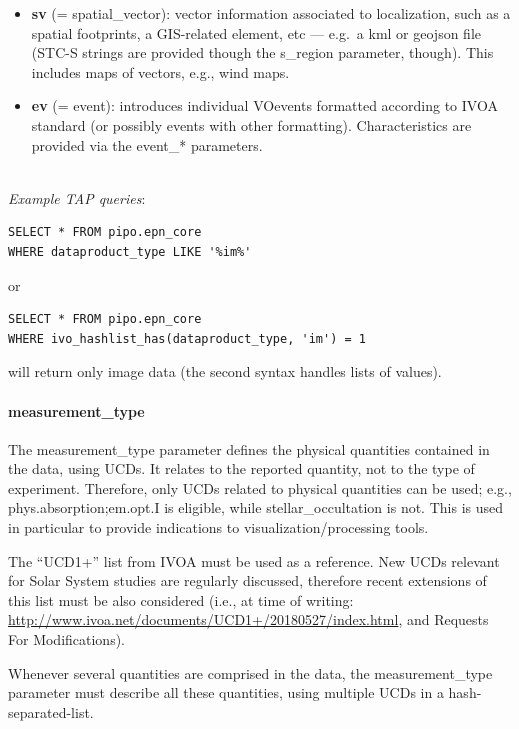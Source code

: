 \documentclass[11pt,a4paper]{ivoa}
\begin{document}
\begin{itemize}
\item \textbf{sv} (= spatial\_vector): vector information associated
to localization, such as a spatial footprints, a GIS-related element,
etc —  e.g.\ a kml or geojson file (STC-S strings are provided though
the s\_region parameter, though). This includes maps of vectors, e.g.,
wind maps.

\item \textbf{ev} (= event): introduces individual VOevents
formatted according to IVOA standard (or possibly events with other
formatting). Characteristics are provided via the event\_* parameters.

\end{itemize}

\textbf{\\}
\emph{Example TAP queries}:

\begin{verbatim}
SELECT * FROM pipo.epn_core
WHERE dataproduct_type LIKE '%im%'
\end{verbatim}

or

\begin{verbatim}
SELECT * FROM pipo.epn_core
WHERE ivo_hashlist_has(dataproduct_type, 'im') = 1
\end{verbatim}

will return only image data (the second syntax handles lists of values).

\paragraph{measurement\_type}

The measurement\_type parameter defines the physical quantities
contained in the data, using UCDs. It relates to the reported quantity,
not to the type of experiment. Therefore, only UCDs related to physical
quantities can be used; e.g., phys.absorption;em.opt.I is eligible,
while stellar\_occultation is not. This is used in particular to provide
indications to visualization/processing tools.

The ``UCD1+'' list from IVOA must be used as a
reference. New UCDs relevant for Solar System studies
are regularly discussed, therefore recent extensions
of this list must be also considered (i.e., at time of writing:
\url{http://www.ivoa.net/documents/UCD1+/20180527/index.html},
and Requests For Modifications).

Whenever several quantities are comprised in the data, the
measurement\_type parameter must describe all these quantities, using
multiple UCDs in a hash-separated-list.
\end{document}
